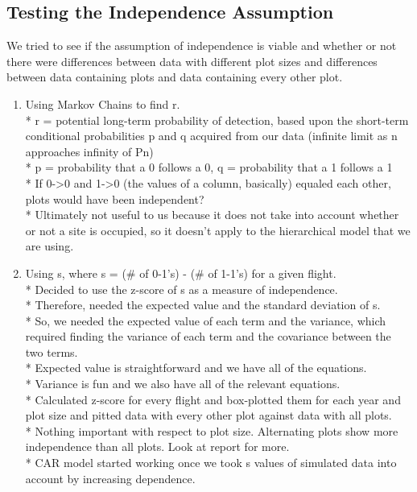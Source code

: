 \documentclass{article}
\begin{document}
	\subsection{Testing the Independence Assumption}
		We tried to see if the assumption of independence is viable and whether or
			not there were differences between data with different plot sizes and 
			differences between data containing plots and data containing every 
			other plot.
	\begin{enumerate}
    	\item Using Markov Chains to find r. \\
          * r = potential long-term probability of detection, based upon the 
			short-term conditional probabilities p and q acquired from our data 
			(infinite limit as n approaches infinity of Pn) \\
          * p = probability that a 0 follows a 0, q = probability that a 1 follows
			 a 1  \\
          * If 0->0 and 1->0 (the values of a column, basically) equaled each 
			other, plots would have been independent?  \\
          * Ultimately not useful to us because it does not take into account 
			whether or not a site is occupied, so it doesn't apply to the 
			hierarchical model that we are using. \\
   		\item Using s, where s = (\# of 0-1's) - (\# of 1-1's) for a given flight.\\
          * Decided to use the z-score of s as a measure of independence.  \\
          * Therefore, needed the expected value and the standard deviation of s. \\
          * So, we needed the expected value of each term and the variance, which 
			required finding the variance of each term and the covariance between 
			the two terms. \\
          * Expected value is straightforward and we have all of the equations. \\
          * Variance is fun and we also have all of the relevant equations. \\
          * Calculated z-score for every flight and box-plotted them for each year
			and plot size and pitted data with every other plot against data with
			all plots. \\
          * Nothing important with respect to plot size. Alternating plots show 
			more independence than all plots. Look at report for more. \\
          * CAR model started working once we took s values of simulated data into
			account by increasing dependence.  \\
	\end{enumerate}
\end{document}
